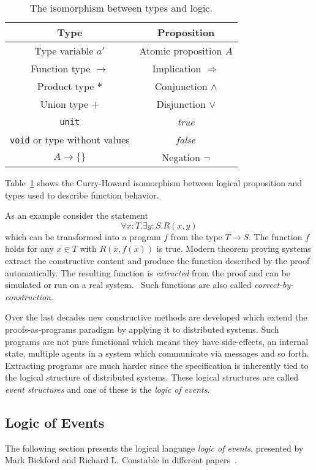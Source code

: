 \begin{table}[h]
  \centering
  \begin{tabular}{c|c}
    Type & Proposition\\\hline
    Type variable $a'$ & Atomic proposition $A$\\
    Function type $\rightarrow$ & Implication $\Rightarrow$\\
    Product type $*$ & Conjunction $\wedge$\\
    Union type $+$ & Disjunction $\vee$\\
    \texttt{unit} & \textit{true} \\
    \texttt{void} or type without values & \textit{false}\\
    $A\rightarrow \{\}$ & Negation $\neg$ \\
  \end{tabular}
  \caption{The isomorphism between types and logic.}
  \label{tab:proofsasprogs}
\end{table}

Table~\ref{tab:proofsasprogs} shows the Curry-Howard isomorphism between
logical proposition and types used to describe function behavior.

As an example consider the statement
\[
  \forall x:T.\exists y:S.R(x,y)
\]
which can be transformed into a program $f$ from the type $T\rightarrow S$.
The function $f$ holds for any $x\in T$ with $R(x,f(x))$ is true.
Modern theorem proving systems extract the constructive content and
produce the function described by the proof automatically.
The resulting function is \textit{extracted} from the proof
and can be simulated or run on a real system.~\cite{bickford2009component}
Such functions are also called \textit{correct-by-construction}.

Over the last decades new constructive methods are developed which
extend the proofs-as-programs paradigm by applying it to distributed
systems. Such programs are not pure functional which means they have
side-effects, an internal state, multiple agents in a system which
communicate via messages and so forth. Extracting programs
are much harder since the specification is inherently tied to
the logical structure of distributed systems. These logical
structures are called \textit{event structures} and one of these
is the \textit{logic of events}.~\cite{bickford2009component}


\subsection{Logic of Events}
The following section presents the logical language \textit{logic of events},
presented by Mark Bickford and Richard L. Constable in different
papers~\cite{bickford2003logic, bickford2005causal, bickford2009component}.

